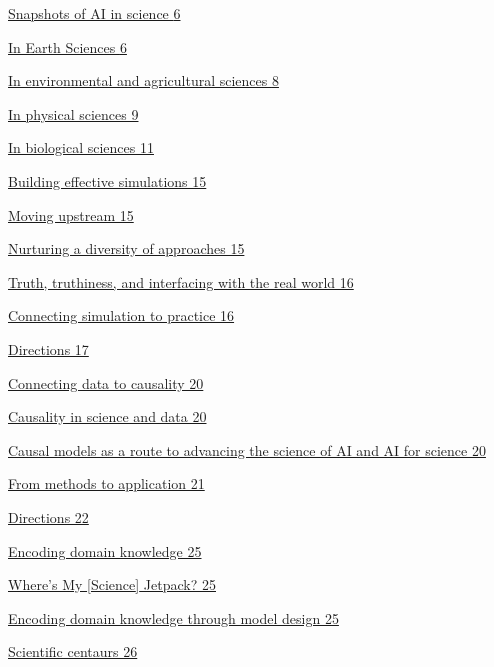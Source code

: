 \protect\hyperlink{snapshots-of-ai-in-science}{Snapshots of AI in
science \protect\hyperlink{snapshots-of-ai-in-science}{6}}

\protect\hyperlink{in-earth-sciences}{In Earth Sciences
\protect\hyperlink{in-earth-sciences}{6}}

\protect\hyperlink{in-environmental-and-agricultural-sciences}{In
environmental and agricultural sciences
\protect\hyperlink{in-environmental-and-agricultural-sciences}{8}}

\protect\hyperlink{in-physical-sciences}{In physical sciences 9}

\protect\hyperlink{section}{In biological sciences 11}

\protect\hyperlink{building-effective-simulations}{Building effective
simulations 15}

\protect\hyperlink{moving-upstream}{Moving upstream 15}

\protect\hyperlink{nurturing-a-diversity-of-approaches}{Nurturing a
diversity of approaches 15}

\protect\hyperlink{truth-truthiness-and-interfacing-with-the-real-world}{Truth,
truthiness, and interfacing with the real world 16}

\protect\hyperlink{connecting-simulation-to-practice}{Connecting
simulation to practice 16}

\protect\hyperlink{directions}{Directions 17}

\protect\hyperlink{connecting-data-to-causality}{Connecting data to
causality 20}

\protect\hyperlink{causality-in-science-and-data}{Causality in science
and data 20}

\protect\hyperlink{causal-models-as-a-route-to-advancing-the-science-of-ai-and-ai-for-science}{Causal
models as a route to advancing the science of AI and AI for science 20}

\protect\hyperlink{from-methods-to-application}{From methods to
application 21}

\protect\hyperlink{directions-1}{Directions 22}

\protect\hyperlink{encoding-domain-knowledge}{Encoding domain knowledge
25}

\protect\hyperlink{wheres-my-science-jetpack}{Where's My {[}Science{]}
Jetpack? 25}

\protect\hyperlink{encoding-domain-knowledge-through-model-design}{Encoding
domain knowledge through model design 25}

\protect\hyperlink{scientific-centaurs}{Scientific centaurs 26}

